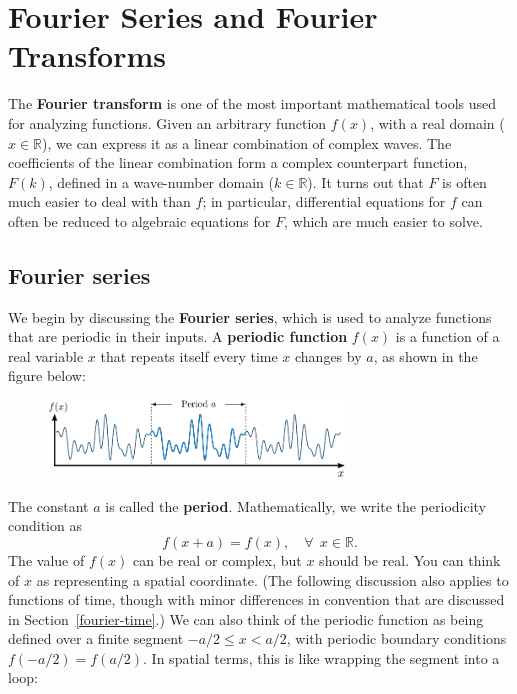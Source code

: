 \documentclass[10pt,a4paper]{article}
\begin{document}
\setcounter{page}{73}

\section{Fourier Series and Fourier Transforms}
\label{fourier-series-and-fourier-transforms}

The \textbf{Fourier transform} is one of the most important mathematical
tools used for analyzing functions. Given an arbitrary function
$f(x)$, with a real domain ($x \in \mathbb{R}$), we can express it
as a linear combination of complex waves. The coefficients of the linear
combination form a complex counterpart function, $F(k)$, defined in a
wave-number domain ($k \in \mathbb{R}$). It turns out that $F$ is
often much easier to deal with than $f$; in particular, differential
equations for $f$ can often be reduced to algebraic equations for
$F$, which are much easier to solve.

\subsection{Fourier series}
\label{fourier-series}

We begin by discussing the \textbf{Fourier series}, which is used to
analyze functions that are periodic in their inputs. A \textbf{periodic
function} $f(x)$ is a function of a real variable $x$ that repeats
itself every time $x$ changes by $a$, as shown in the figure below:

\begin{figure}[ht]
  \centering\includegraphics[width=0.7\textwidth]{periodicity}
\end{figure}

\noindent
The constant $a$ is called the \textbf{period}. Mathematically, we
write the periodicity condition as
\begin{equation}
f(x+a) = f(x), \quad\forall\;\, x\in \mathbb{R}.
\end{equation}
The value of $f(x)$ can be real or complex, but $x$ should be real.
You can think of $x$ as representing a spatial coordinate. (The
following discussion also applies to functions of time, though with
minor differences in convention that are discussed in
Section~\ref{fourier-time}.) We can also think of the periodic
function as being defined over a finite segment $-a/2 \le x < a/2$,
with periodic boundary conditions $f(-a/2) = f(a/2)$. In spatial
terms, this is like wrapping the segment into a loop:
\end{document}
